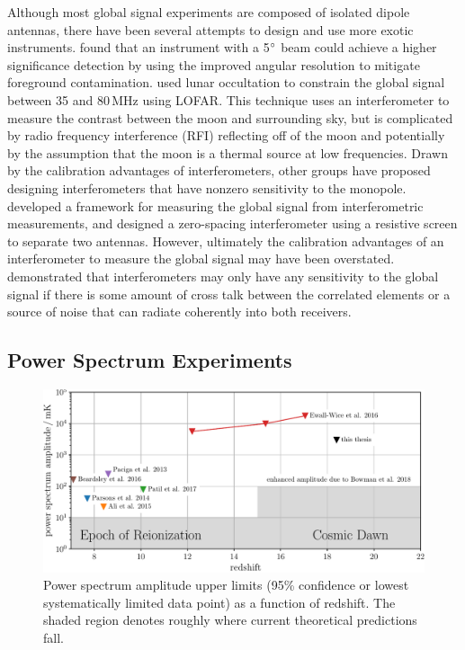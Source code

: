 \begin{bibunit}


Although most global signal experiments are composed of isolated dipole antennas, there have been
several attempts to design and use more exotic instruments. \citet{2013PhRvD..87d3002L} found that
an instrument with a 5$\mbox{$^\circ$}$ beam could achieve a higher significance detection by using the
improved angular resolution to mitigate foreground contamination. \citet{2015MNRAS.450.2291V} used
lunar occultation to constrain the global signal between 35 and 80\,MHz using LOFAR. This technique
uses an interferometer to measure the contrast between the moon and surrounding sky, but is
complicated by radio frequency interference (RFI) reflecting off of the moon and potentially by the
assumption that the moon is a thermal source at low frequencies. Drawn by the calibration advantages
of interferometers, other groups have proposed designing interferometers that have nonzero
sensitivity to the monopole. \citet{2015ApJ...809...18P} developed a framework for measuring the
global signal from interferometric measurements, and \citet{2015ApJ...815...88S} designed a
zero-spacing interferometer using a resistive screen to separate two antennas. However, ultimately
the calibration advantages of an interferometer to measure the global signal may have been
overstated.  \citet{2016ApJ...826..116V} demonstrated that interferometers may only have any
sensitivity to the global signal if there is some amount of cross talk between the correlated
elements or a source of noise that can radiate coherently into both receivers.

\subsection{Power Spectrum Experiments}

\begin{figure}[t]
    \centering
    \includegraphics[width=\textwidth]{figures/chapter1/power-spectrum-upper-limits/power-spectrum-upper-limits}
    \caption{
        Power spectrum amplitude upper limits (95\% confidence or lowest systematically limited data
        point) as a function of redshift. The shaded region denotes roughly where current
        theoretical predictions fall.
    }
    \label{fig:power-spectrum-upper-limits}
\end{figure}


\end{bibunit}
